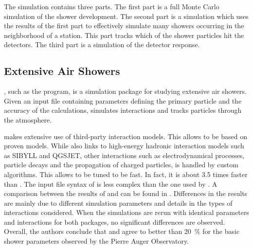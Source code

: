The simulation contains three parts.
The first part is a full Monte Carlo simulation of the shower development.  The
second part is a simulation which uses the results of the first part to
effectively simulate many showers occurring in the neighborhood of a \hisparc
station.  This part tracks which of the shower particles hit the detectors. The
third part is a simulation of the detector response.


\subsection{Extensive Air Showers}
\label{sec:shower-simulation}

\aires \cite{Sciutto:1999}, such as the \corsika \cite{Corsika} program, is a
simulation package for studying extensive air showers.
Given an input file containing parameters defining the primary particle and
the accuracy of the calculations, \aires simulates interactions and tracks
particles through the atmosphere.

\corsika makes extensive use of third-party interaction models.  This allows
\corsika to be based on proven models.  While \aires also links to high-energy
hadronic interaction models such as SIBYLL and QGSJET, other interactions such
as electrodynamical processes, particle decays and the propagation of charged
particles, is handled by custom algorithms.  This allows \aires to be tuned to
be fast.  In fact, it is about \num{3.5} times faster than \corsika
\cite{Knapp:2002}.  The input file syntax of \aires is less complex than
the one used by \corsika.  A comparison between the results of \aires and
\corsika can be found in \cite{Knapp:2002}.  Differences in the results are
mainly due to different simulation parameters and details in the types
of interactions considered.  When the simulations are rerun with identical
parameters and interactions for both packages, no significant differences are
observed.
Overall, the authors conclude that \corsika and \aires agree to better than
\SI{20}{\percent} for the basic shower parameters observed by the Pierre Auger
Observatory.


